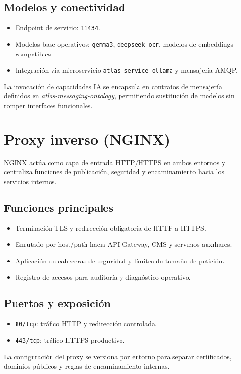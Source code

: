 \subsection*{Modelos y conectividad}

\begin{itemize}
\item Endpoint de servicio: \texttt{11434}.
\item Modelos base operativos: \texttt{gemma3}, \texttt{deepseek-ocr}, modelos de embeddings compatibles.
\item Integración vía microservicio \texttt{atlas-service-ollama} y mensajería AMQP.
\end{itemize}

La invocación de capacidades IA se encapsula en contratos de mensajería definidos en \textit{atlas-messaging-ontology}, permitiendo sustitución de modelos sin romper interfaces funcionales.

\section{Proxy inverso (NGINX)}

NGINX actúa como capa de entrada HTTP/HTTPS en ambos entornos y centraliza funciones de publicación, seguridad y encaminamiento hacia los servicios internos.

\subsection*{Funciones principales}

\begin{itemize}
\item Terminación TLS y redirección obligatoria de HTTP a HTTPS.
\item Enrutado por host/path hacia API Gateway, CMS y servicios auxiliares.
\item Aplicación de cabeceras de seguridad y límites de tamaño de petición.
\item Registro de accesos para auditoría y diagnóstico operativo.
\end{itemize}

\subsection*{Puertos y exposición}

\begin{itemize}
\item \texttt{80/tcp}: tráfico HTTP y redirección controlada.
\item \texttt{443/tcp}: tráfico HTTPS productivo.
\end{itemize}

La configuración del proxy se versiona por entorno para separar certificados, dominios públicos y reglas de encaminamiento internas.
